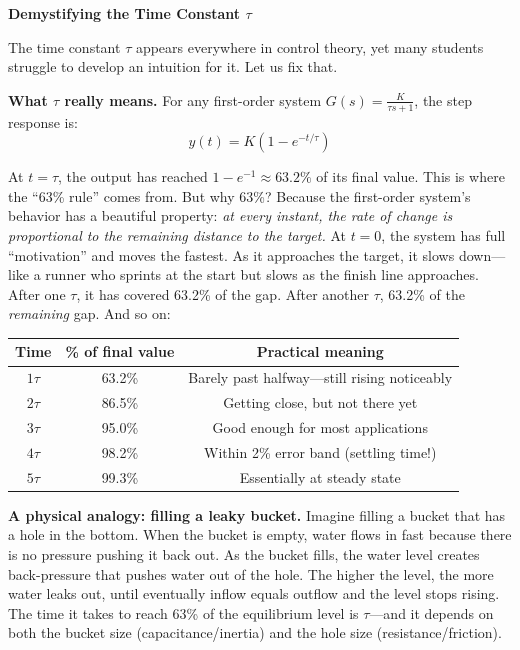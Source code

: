 \vspace{0.5em}
\begin{mdframed}[linewidth=1pt, innertopmargin=10pt, innerbottommargin=10pt]
\textbf{Demystifying the Time Constant $\tau$}

\vspace{0.3em}
The time constant $\tau$ appears everywhere in control theory, yet many students struggle to develop an intuition for it. Let us fix that.

\textbf{What $\tau$ really means.} For any first-order system $G(s) = \frac{K}{\tau s + 1}$, the step response is:
\[
y(t) = K\left(1 - e^{-t/\tau}\right)
\]

At $t = \tau$, the output has reached $1 - e^{-1} \approx 63.2\%$ of its final value. This is where the ``63\% rule'' comes from. But why 63\%? Because the first-order system's behavior has a beautiful property: \textit{at every instant, the rate of change is proportional to the remaining distance to the target.} At $t = 0$, the system has full ``motivation'' and moves the fastest. As it approaches the target, it slows down---like a runner who sprints at the start but slows as the finish line approaches. After one $\tau$, it has covered 63.2\% of the gap. After another $\tau$, 63.2\% of the \textit{remaining} gap. And so on:

\begin{center}
\begin{tabular}{ccc}
\toprule
\textbf{Time} & \textbf{\% of final value} & \textbf{Practical meaning} \\
\midrule
$1\tau$ & 63.2\% & Barely past halfway---still rising noticeably \\
$2\tau$ & 86.5\% & Getting close, but not there yet \\
$3\tau$ & 95.0\% & Good enough for most applications \\
$4\tau$ & 98.2\% & Within 2\% error band (settling time!) \\
$5\tau$ & 99.3\% & Essentially at steady state \\
\bottomrule
\end{tabular}
\end{center}

\textbf{A physical analogy: filling a leaky bucket.} Imagine filling a bucket that has a hole in the bottom. When the bucket is empty, water flows in fast because there is no pressure pushing it back out. As the bucket fills, the water level creates back-pressure that pushes water out of the hole. The higher the level, the more water leaks out, until eventually inflow equals outflow and the level stops rising. The time it takes to reach 63\% of the equilibrium level is $\tau$---and it depends on both the bucket size (capacitance/inertia) and the hole size (resistance/friction).


\end{mdframed}
